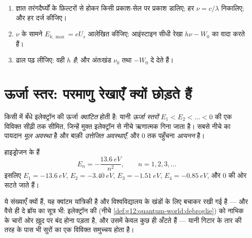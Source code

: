 \begin{method}[प्लांक नियतांक नापना]\label{met:g12:quantum-world:measure-h}
\begin{enumerate}
  \item ज्ञात तरंगदैर्घ्यों के फ़िल्टरों से होकर किसी
        प्रकाश-सेल पर प्रकाश डालिए; हर $\nu = c/\lambda$ निकालिए; और हर  दर्ज कीजिए।
  \item $\nu$ के सामने $E_{k,\max} = eU_s$ आलेखित कीजिए: आइंस्टाइन सीधी रेखा $h\nu - W_0$ का
        वादा करते हैं।
  \item ढाल पढ़ लीजिए: वही $h$ \emph{है}; और अंतःखंड $\nu_0$ तथा $-W_0$
        दे देते हैं।
\end{enumerate}
\end{method}

\section{ऊर्जा स्तर: परमाणु रेखाएँ क्यों छोड़ते हैं}

\begin{definition}[ऊर्जा स्तर]\label{def:g12:quantum-world:levels}
किसी  में बँधे इलेक्ट्रॉन की ऊर्जा
\emph{क्वांटित} होती है: यानी \emph{ऊर्जा स्तरों} $E_1 < E_2 < \dots < 0$ की एक विविक्त सीढ़ी तक सीमित, जिन्हें मुक्त इलेक्ट्रॉन से नीचे
ऋणात्मक गिना जाता है। सबसे नीचे का पायदान \emph{मूल अवस्था}
है और बाक़ी \emph{उत्तेजित अवस्थाएँ}; और $0$ तक
पहुँचना \emph{आयनन} है।
\end{definition}

\begin{proposition}[हाइड्रोजन की सीढ़ी]\label{prop:g12:quantum-world:hydrogen}
हाइड्रोजन  के  हैं
\[
E_n = -\frac{\qty{13.6}{eV}}{n^2}, \qquad n = 1, 2, 3, \dots
\]
इसलिए $E_1 = \qty{-13.6}{eV}$, $E_2 = \qty{-3.40}{eV}$, $E_3 =
\qty{-1.51}{eV}$, $E_4 = \qty{-0.85}{eV}$, और $0$ की ओर सटते जाते हैं।
\end{proposition}
\admitted

\begin{remark}[यह सीढ़ी आती कहाँ से है]\label{rem:g12:quantum-world:ladder-origin}
ये संख्याएँ क्यों हैं, यह क्वांटम यांत्रिकी है और विश्वविद्यालय के खंडों के लिए
बचाकर रखी गई है --- और वैसे ही दे ब्रॉय का सूत्र भी: इलेक्ट्रॉन की
 (नीचे \cref{def:g12:quantum-world:debroglie}) को नाभिक के चारों ओर ख़ुद पर बंद होना
पड़ता है, और उसमें केवल कुछ ही  अँटते हैं --- यानी गिटार के
तार की तरह  के पास भी सुरों का एक विविक्त समुच्चय होता है।
\end{remark}

